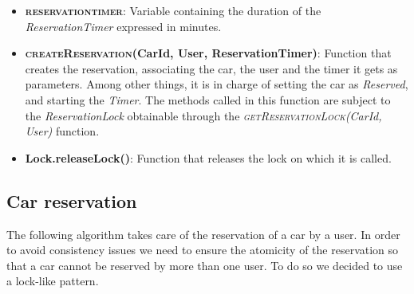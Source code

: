 \begin{itemize}
	\item \textbf{\textsc{reservation\textunderscore timer}}: Variable containing the duration of the
                                                            \textit{ReservationTimer} expressed in
                                                            minutes.
  \item \textbf{\textsc{createReservation}(CarId, User, ReservationTimer)}: Function that creates the
                                                                            reservation, associating the
                                                                            car, the user and the timer
                                                                            it gets as parameters.
                                                                            Among other things, it is
                                                                            in charge of setting the car
                                                                            as \textit{Reserved}, and
                                                                            starting the \textit{Timer}.
                                                                            The methods called in this
                                                                            function are subject to
                                                                            the \textit{ReservationLock}
                                                                            obtainable through the
                                                                            \textit{\textsc{getReservationLock}(CarId, User)}
                                                                            function.
	\item \textbf{Lock.releaseLock()}: Function that releases the lock on which it is called.
\end{itemize}

\pagebreak

\subsection{Car reservation}
The following algorithm takes care of the reservation of a car by a user. In order to avoid consistency
issues we need to ensure the atomicity of the reservation so that a car cannot be reserved by more than
one user. To do so we decided to use a lock-like pattern.


